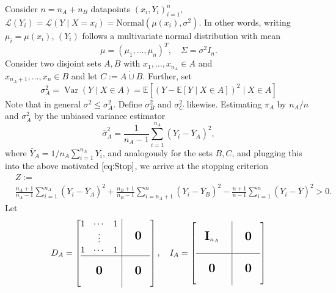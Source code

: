 \documentclass{article}
\theoremstyle{definition}
\theoremstyle{remark}
\newcommand{\E }{\mathbb{E}}  %
\newcommand{\Var}{\operatorname{Var}}  %
\newcommand{\bigzero}{\mbox{\normalfont\Large\bfseries 0}}
\newcommand{\bigone}{\mbox{\normalfont\Large\bfseries I}}
\begin{document}
Consider $n = n_A + n_B$ datapoints $(x_i, Y_i)_{i=1}^n$, $\mathcal{L}(Y_i) =  \mathcal{L}(Y \mid X = x_i) = \text{Normal}(\mu(x_i), \sigma^2)$. In other words, writing $\mu_i = \mu(x_i)$, $(Y_i)$ follows a multivariate normal distribution with mean
$$
	\mu = (\mu_1, \dots, \mu_n)^T, \quad \Sigma = \sigma^2 I_n.
$$
Consider two disjoint sets $A, B$ with $x_1, \dots, x_{n_A} \in A$ and \\ $x_{n_A +1}, \dots, x_{n} \in B$ and let $C := A \dot \cup B$. Further, set
$$
	\sigma^2_A = \Var(Y \mid X \in A) = \E[(Y - \E[Y \mid X \in A])^2 \mid X \in A]
$$
Note that in general $\sigma^2 \leq \sigma^2_A$. Define $\sigma^2_B$ and $\sigma^2_C$ likewise. Estimating $\pi_A$ by $n_A/n$ and $\sigma^2_A$ by the unbiased variance estimator
$$
	\hat \sigma^2_A = \frac{1}{n_A - 1} \sum_{i=1}^{n_A} (Y_i - \bar Y_A)^2,
$$
where $\bar Y_A = 1/n_A \sum_{i=1}^{n_A} Y_i$, and analogously for the sets $B, C$, and plugging this into the above motivated $\eqref{eq:Stop}$, we arrive at the stopping criterion
\begin{align}\label{eq:Stop2}
	 & Z :=                                                                                                                             \\
	 & \frac{n_A + 1}{n_A - 1} \sum_{i=1}^{n_A} (Y_i - \bar Y_A)^2 + \frac{n_B + 1}{n_B - 1} \sum_{i= n_A + 1}^{n} (Y_i - \bar Y_B)^2 -
	\frac{n+1}{n - 1} \sum_{i=1}^{n} (Y_i - \bar Y)^2 > 0.
\end{align}
Let
\begin{align}
	D_A =\left[\begin{array}{@{}c|c@{}}
			           \begin{matrix}
				1 & \cdots & 1 \\
				  & \vdots     \\
				1 & \cdots & 1
			\end{matrix}
			                    & \quad \bigzero \quad \\
			           \hline                          \\
			           \bigzero &
			           \bigzero                        \\
			           \quad
		           \end{array}\right],
	\quad
	I_A =\left[\begin{array}{@{}c|c@{}}
			           \quad                           \\
			           \quad \bigone_{n_A} \quad
			                    & \quad \bigzero \quad \\
			           \quad                           \\
			           \hline                          \\
			           \bigzero &
			           \bigzero                        \\
			           \quad
		           \end{array}\right]
\end{align}
\end{document}
